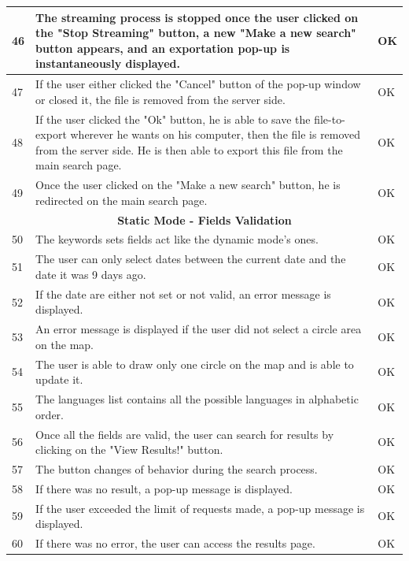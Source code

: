 \documentclass[a4paper,11pt]{report}
\begin{document}
\begin{center}
\begin{longtable}{|l|p{10cm}|p{4.4cm}|}
	46 & The streaming process is stopped once the user clicked on the "Stop Streaming" button, a new "Make a new search" button appears, and an exportation pop-up is instantaneously displayed. & \color{ForestGreen}OK\color{black}\\\hline
	47 & If the user either clicked the "Cancel" button of the pop-up window or closed it, the file is removed from the server side. & \color{ForestGreen}OK\color{black}\\\hline
	48 & If the user clicked the "Ok" button, he is able to save the file-to-export wherever he wants on his computer, then the file is removed from the server side. He is then able to export this file from the main search page. & \color{ForestGreen}OK\color{black}\\\hline
	49 & Once the user clicked on the "Make a new search" button, he is redirected on the main search page. & \color{ForestGreen}OK\color{black}\\\hline
	 
	\multicolumn{3}{|c|}{\textbf{Static Mode - Fields Validation}}\\\hline
	50 & The keywords sets fields act like the dynamic mode's ones. & \color{ForestGreen}OK\color{black}\\\hline
	51 & The user can only select dates between the current date and the date it was 9 days ago. & \color{ForestGreen}OK\color{black}\\\hline
	52 & If the date are either not set or not valid, an error message is displayed. & \color{ForestGreen}OK\color{black}\\\hline
	53 & An error message is displayed if the user did not select a circle area on the map. & \color{ForestGreen}OK\color{black}\\\hline
	54 & The user is able to draw only one circle on the map and is able to update it. & \color{ForestGreen}OK\color{black}\\\hline
	55 & The languages list contains all the possible languages in alphabetic order. & \color{ForestGreen}OK\color{black}\\\hline
	56 & Once all the fields are valid, the user can search for results by clicking on the "View Results!" button. & \color{ForestGreen}OK\color{black}\\\hline
	57 & The button changes of behavior during the search process. & \color{ForestGreen}OK\color{black}\\\hline
	58 & If there was no result, a pop-up message is displayed. & \color{ForestGreen}OK\color{black}\\\hline
	59 & If the user exceeded the limit of requests made, a pop-up message is displayed. & \color{ForestGreen}OK\color{black}\\\hline
	60 & If there was no error, the user can access the results page. & \color{ForestGreen}OK\color{black}\\\hline
	 

\end{longtable}
\end{center}
\end{document}
